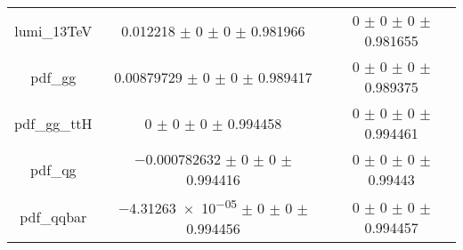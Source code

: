 \begin{table}
\begin{tabular}{ccc}
lumi\_13TeV & \num{0.012218} $\pm$ \num{0} $\pm$ \num{0} $\pm$ \num{0.981966} & \num{0} $\pm$ \num{0} $\pm$ \num{0} $\pm$ \num{0.981655}\\
pdf\_gg & \num{0.00879729} $\pm$ \num{0} $\pm$ \num{0} $\pm$ \num{0.989417} & \num{0} $\pm$ \num{0} $\pm$ \num{0} $\pm$ \num{0.989375}\\
pdf\_gg\_ttH & \num{0} $\pm$ \num{0} $\pm$ \num{0} $\pm$ \num{0.994458} & \num{0} $\pm$ \num{0} $\pm$ \num{0} $\pm$ \num{0.994461}\\
pdf\_qg & \num{-0.000782632} $\pm$ \num{0} $\pm$ \num{0} $\pm$ \num{0.994416} & \num{0} $\pm$ \num{0} $\pm$ \num{0} $\pm$ \num{0.99443}\\
pdf\_qqbar & \num{-4.31263e-05} $\pm$ \num{0} $\pm$ \num{0} $\pm$ \num{0.994456} & \num{0} $\pm$ \num{0} $\pm$ \num{0} $\pm$ \num{0.994457}\\
\bottomrule
\end{tabular}
\end{table}